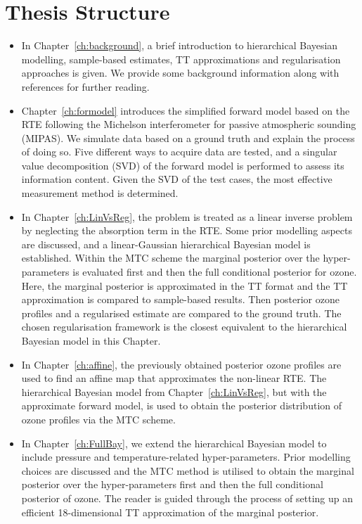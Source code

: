 \section{Thesis Structure}
\begin{itemize}
	\item In Chapter~\ref{ch:background}, a brief introduction to hierarchical Bayesian modelling, sample-based estimates, TT approximations and regularisation approaches is given. We provide some background information along with references for further reading.
	\item Chapter~\ref{ch:formodel} introduces the simplified forward model based on the RTE following the Michelson interferometer for passive atmospheric sounding (MIPAS).
	We simulate data based on a ground truth and explain the process of doing so.
	Five different ways to acquire data are tested, and a singular value decomposition (SVD) of the forward model is performed to assess its information content.
	Given the SVD of the test cases, the most effective measurement method is determined.
	\item In Chapter~\ref{ch:LinVsReg}, the problem is treated as a linear inverse problem by neglecting the absorption term in the RTE. Some prior modelling aspects are discussed, and a linear-Gaussian hierarchical Bayesian model is established.
	Within the MTC scheme the marginal posterior over the hyper-parameters is evaluated first and then the full conditional posterior for ozone.
	Here, the marginal posterior is approximated in the TT format and the TT approximation is compared to sample-based results.
	Then posterior ozone profiles and a regularised estimate are compared to the ground truth.
	The chosen regularisation framework is the closest equivalent to the hierarchical Bayesian model in this Chapter.
	\item In Chapter~\ref{ch:affine}, the previously obtained posterior ozone profiles are used to find an affine map that approximates the non-linear RTE. The hierarchical Bayesian model from Chapter~\ref{ch:LinVsReg}, but with the approximate forward model, is used to obtain the posterior distribution of ozone profiles via the MTC scheme.
	\item In Chapter~\ref{ch:FullBay}, we extend the hierarchical Bayesian model to include pressure and temperature-related hyper-parameters.
	Prior modelling choices are discussed and the MTC method is utilised to obtain the marginal posterior over the hyper-parameters first and then the full conditional posterior of ozone.
	The reader is guided through the process of setting up an efficient 18-dimensional TT approximation of the marginal posterior.

\end{itemize}

